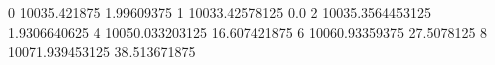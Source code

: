 0 10035.421875 1.99609375
1 10033.42578125 0.0
2 10035.3564453125 1.9306640625
4 10050.033203125 16.607421875
6 10060.93359375 27.5078125
8 10071.939453125 38.513671875
